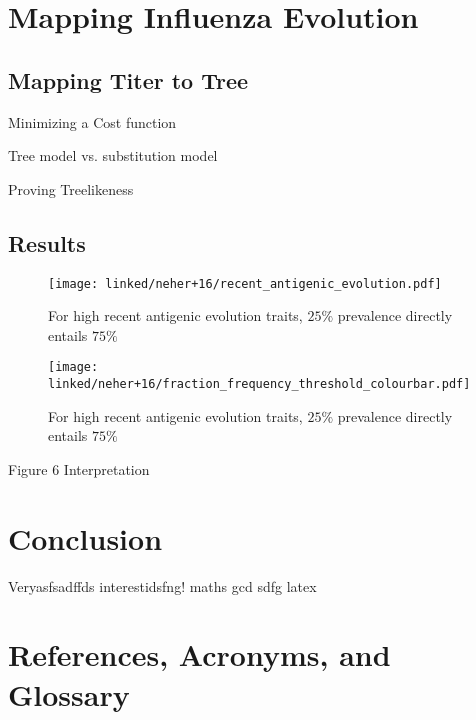 \documentclass[12pt]{scrartcl}
\begin{document}
\section{Mapping Influenza Evolution}

  \subsection{Mapping Titer to Tree}

    Minimizing a Cost function

    Tree model vs. substitution model

    Proving Treelikeness

  \subsection{Results}

  \begin{figure}[h!]
    \texttt{[image: linked/neher+16/recent\_antigenic\_evolution.pdf]}
    \caption{\footnotesize For high recent antigenic evolution traits, $25\%$ prevalence directly entails $75\%$ \cite{neherBedford+16}}
  \end{figure}

  \begin{figure}[h!]
    \texttt{[image: linked/neher+16/fraction\_frequency\_threshold\_colourbar.pdf]}
    \caption{\footnotesize For high recent antigenic evolution traits, $25\%$ prevalence directly entails $75\%$ \cite{neherBedford+16}}
  \end{figure}

    Figure 6 Interpretation

\section{Conclusion}

  Veryasfsadffds interestidsfng! \gls{maths} \acrfull{gcd} sdfg \gls{latex}

\clearpage


\section{References, Acronyms, and Glossary}





\printglossary[type=\acronymtype]

\printglossary

% 

% 


\end{document}
